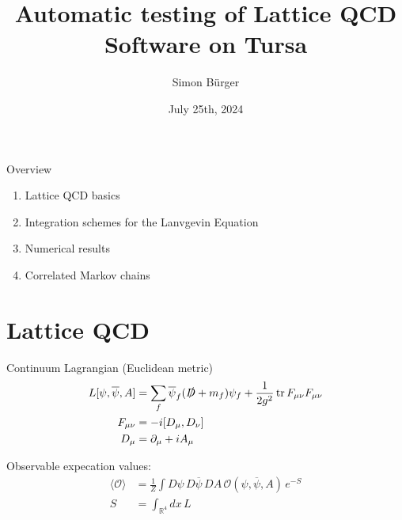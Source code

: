 \documentclass[english,xcolor=pst,11pt]{beamer}
\title[Langevin Integration and Correlated Markov Chains]{Automatic testing of Lattice QCD Software on Tursa}
\author{Simon Bürger}
\date{July 25th, 2024}
\begin{document}
\maketitle

\begin{frame}
 \begin{block}{Overview}
  \begin{enumerate}
   \item Lattice QCD basics
   \item Integration schemes for the Lanvgevin Equation
   \item Numerical results
   \item Correlated Markov chains
  \end{enumerate}
 \end{block}

\end{frame}



\section{Lattice QCD}

\begin{frame}



Continuum Lagrangian (Euclidean metric)
\begin{align*}
 L[\psi,\overline\psi,A] &= \sum_f\overline\psi_f (\slashed D + m_f)\psi_f + \frac{1}{2g^2}\trace F_{\mu\nu}F_{\mu\nu} \\
 F_{\mu\nu} &= -i[D_\mu,D_\nu] \\
 D_\mu &= \partial_\mu + iA_\mu\
\end{align*}

Observable expecation values:
\begin{align*}
 \langle \mathcal O \rangle &= \frac{1}{Z} \int D\psi\, D\overline\psi\, DA\,\mathcal O(\psi,\overline\psi,A)\, e^{-S} \\
 S &= \int_{\mathbb{R}^4}dx\, L
\end{align*}
\end{frame}
\end{document}
